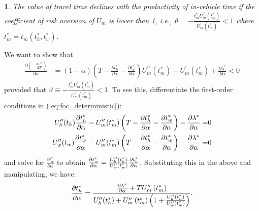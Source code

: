 \documentclass[12pt,a4paper,british]{article}
\makeatletter
\theoremstyle{definition}
\theoremstyle{plain}
\newenvironment{proof}[1][\proofname]{\par
    \normalfont\topsep6\p@\@plus6\p@\relax
    \trivlist
    \itemindent\parindent
    \item[\hskip\labelsep
          \scshape
      #1]\ignorespaces
  }{%
    \endtrivlist\@endpefalse
  }
\providecommand{\proofname}{Proof}
\theoremstyle{plain}
\newtheorem{prop}{\protect\propositionname}
\providecommand{\propositionname}{Proposition}
\makeatother
\begin{document}
\begin{prop}
The value of travel time declines with the productivity of in-vehicle time if the coefficient of risk aversion of $U_{m}$ is lower than 1, i.e., $\vartheta=-\frac{t_{m}^{\ast}U_{m}^{\prime\prime}\left(t_{m}^{\ast}\right)}{U_{m}^{\prime}\left(t_{m}^{\ast}\right)}<1$ where $t_{m}^{\ast}=t_{m}\left(t_{h}^{\ast},t_{w}^{\ast}\right)$.
\end{prop}


\begin{proof}
We want to show that
\begin{align*}
\frac{\partial\left(-\frac{\mathrm{d}U^{\ast}}{\mathrm{d}T}\right)}{\partial\alpha} & =\left(1-\alpha\right)\left(T-\frac{\partial t_{h}^{\ast}}{\partial\alpha}-\frac{\partial t_{w}^{\ast}}{\partial\alpha}\right)U_{m}^{\prime\prime}\left(t_{m}^{\ast}\right)-U_{m}^{\prime}\left(t_{m}^{\ast}\right)+\frac{\partial\lambda^{\ast}}{\partial\alpha}<0
\end{align*}
provided that $\vartheta\equiv-\frac{t_{m}^{\ast}U_{m}^{\prime\prime}\left(t_{m}^{\ast}\right)}{U_{m}^{\prime}\left(t_{m}^{\ast}\right)}<1$. To see this, differentiate the first-order conditions in (\ref{eq:foc_deterministic}):
\begin{align*}
U_{h}^{\prime\prime}\text{\ensuremath{\left(t_{h}\right)}}\frac{\partial t_{h}^{\ast}}{\partial\alpha}-U_{m}^{\prime\prime}\text{\ensuremath{\left(t_{m}^{\ast}\right)}}\left(T-\frac{\partial t_{h}^{\ast}}{\partial\alpha}-\frac{\partial t_{w}^{\ast}}{\partial\alpha}\right)-\frac{\partial\lambda^{\ast}}{\partial\alpha}= & 0\\
U_{w}^{\prime\prime}\text{\ensuremath{\left(t_{w}\right)}}\frac{\partial t_{w}^{\ast}}{\partial\alpha}-U_{m}^{\prime\prime}\text{\ensuremath{\left(t_{m}^{\ast}\right)}}\left(T-\frac{\partial t_{h}^{\ast}}{\partial\alpha}-\frac{\partial t_{w}^{\ast}}{\partial\alpha}\right)-\frac{\partial\lambda^{\ast}}{\partial\alpha}= & 0
\end{align*}
and solve for $\frac{\partial t_{w}^{\ast}}{\partial\alpha}$ to obtain $\frac{\partial t_{w}^{\ast}}{\partial\alpha}=\frac{U_{h}^{\prime\prime}\text{\ensuremath{\left(t_{h}^{\ast}\right)}}}{U_{w}^{\prime\prime}\text{\ensuremath{\left(t_{w}^{\ast}\right)}}}\frac{\partial t_{h}^{\ast}}{\text{\ensuremath{\partial\alpha}}}$. Substituting this in the above and manipulating, we have: 
\begin{equation*}
\frac{\partial t_{h}^{\ast}}{\partial\alpha}=\frac{\frac{\partial\lambda^{\ast}}{\partial\alpha}+TU_{m}^{\prime\prime}\left(t_{m}^{\ast}\right)}{U_{h}^{\prime\prime}\text{\ensuremath{\left(t_{h}^{\ast}\right)}}+U_{m}^{\prime\prime}\left(t_{m}^{\ast}\right)\left(1+\frac{U_{h}^{\prime\prime}\text{\ensuremath{\left(t_{h}^{\ast}\right)}}}{U_{w}^{\prime\prime}\text{\ensuremath{\left(t_{w}^{\ast}\right)}}}\right)}.

\end{equation*}
\end{proof}
\end{document}
